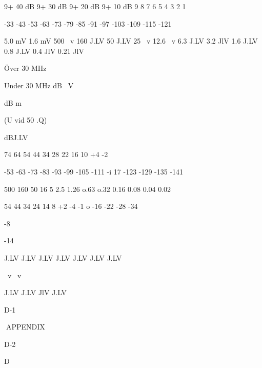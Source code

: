 9+ 40 dB
9+ 30 dB
9+ 20 dB
9+ 10 dB
9
8
7
6
5
4
3
2
1

-33
-43
-53
-63
-73
-79
-85
-91
-97
-103
-109
-115
-121

5.0 mV
1.6 mV
500
~v
160
J.LV
50
J.LV
25
~v
12.6 ~v
6.3 J.LV
3.2 JlV
1.6 J.LV
0.8 J.LV
0.4 JlV
0.21 JlV

Över 30 MHz

Under 30 MHz
dB~ V

dB m

(U vid 50 .Q)

dBJ.LV

74
64
54
44
34
28
22
16
10
+4
-2

-53
-63
-73
-83
-93
-99
-105
-111
-i 17
-123
-129
-135
-141

500
160
50
16
5
2.5
1.26
o.63
o.32
0.16
0.08
0.04
0.02

54
44
34
24
14
8
+2
-4
-1 o
-16
-22
-28
-34

-8

-14

J.LV
J.LV
J.LV
J.LV
J.LV
J.LV
J.LV

~v
~v

J.LV
J.LV
JlV
J.LV

D-1

APPENDIX

D-2

D
